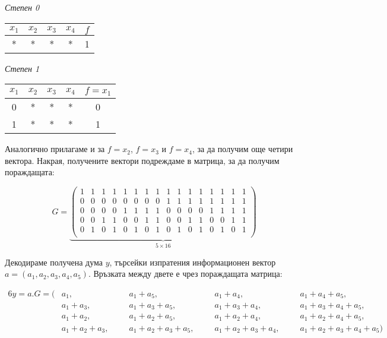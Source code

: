 \documentclass[11pt, oneside]{article}   	%
\begin{document}
\begin{table}[htbp]
    \begin{minipage}[t]{.50\textwidth}
        \textit{Степен 0}
        \begin{tabular}{ccccc}
            \toprule
                \textbf{$x_1$} & \textbf{$x_2$} & \textbf{$x_3$} & \textbf{$x_4$} & \textbf{$f$} \\
            \midrule
                * & * & * & * & 1 \\
            \bottomrule
        \end{tabular}
    \end{minipage} \hfill
    \begin{minipage}[t]{.50\textwidth}
        \textit{Степен 1}
        \begin{tabular}{ccccc}
            \toprule
                \textbf{$x_1$} & \textbf{$x_2$} & \textbf{$x_3$} & \textbf{$x_4$} & \textbf{$f = x_1$} \\
            \midrule
                0 & * & * & * & 0 \\
                1 & * & * & * & 1 \\
            \bottomrule
        \end{tabular}
    \end{minipage} \hfill
\end{table}

Аналогично прилагаме и за $f = x_2$, $f = x_3$ и $f = x_4$, за да получим още четири вектора. Накрая, получените вектори подреждаме в матрица, за да получим пораждащата:

\[
\text{$G = $}
\underbrace{
    \begin{pmatrix}
        1 & 1 & 1 & 1 & 1 & 1 & 1 & 1 & 1 & 1 & 1 & 1 & 1 & 1 & 1 & 1 \\
        0 & 0 & 0 & 0 & 0 & 0 & 0 & 0 & 1 & 1 & 1 & 1 & 1 & 1 & 1 & 1 \\
        0 & 0 & 0 & 0 & 1 & 1 & 1 & 1 & 0 & 0 & 0 & 0 & 1 & 1 & 1 & 1 \\
        0 & 0 & 1 & 1 & 0 & 0 & 1 & 1 & 0 & 0 & 1 & 1 & 0 & 0 & 1 & 1 \\
        0 & 1 & 0 & 1 & 0 & 1 & 0 & 1 & 0 & 1 & 0 & 1 & 0 & 1 & 0 & 1 \\
    \end{pmatrix}
}_{\text{$5 \times 16$}}
\]

Декодираме получена дума $y$, търсейки изпратения информационен вектор $a = (a_1, a_2, a_3, a_4, a_5)$. Връзката между двете е чрез пораждащата матрица:

\begin{alignat*}{6}
y = a.G = (&a_1, &&a_1 + a_5, &&a_1 + a_4, &&a_1 + a_4 + a_5, \\
          &a_1 + a_3, &&a_1 + a_3 + a_5, &&a_1 + a_3 + a_4, &&a_1 + a_3 + a_4 + a_5, \\
          &a_1 + a_2, &&a_1 + a_2 + a_5, &&a_1 + a_2 + a_4, &&a_1 + a_2 + a_4 + a_5, \\
          &a_1 + a_2 + a_3, \hspace{10pt} &&a_1 + a_2 + a_3 + a_5, \hspace{10pt} &&a_1 + a_2 + a_3 + a_4, \hspace{10pt} &&a_1 + a_2 + a_3 + a_4 + a_5)
\end{alignat*}
\end{document}
